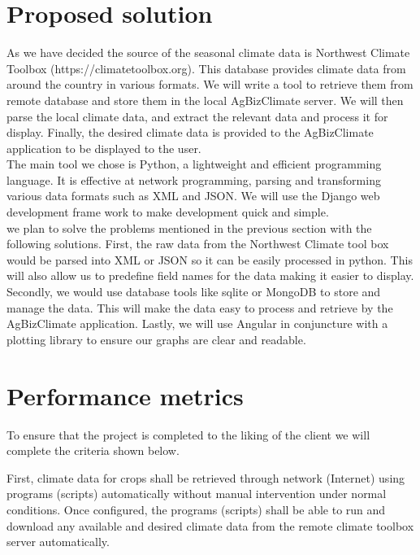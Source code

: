 \documentclass[letterpaper,10pt]{article}
\begin{document}
	  \section*{Proposed solution}
   As we have decided the source of the seasonal climate data is Northwest Climate Toolbox (https://climatetoolbox.org). This database provides climate data from around the country in various formats. We will write a tool to retrieve them from remote database and store them in the local AgBizClimate server. We will then  parse the local climate data, and extract the relevant data and process it for display. Finally, the desired climate data is provided to the AgBizClimate application to be displayed to the user.\\
   
   The main tool we chose is Python, a lightweight and efficient programming language. It is effective at network programming, parsing and transforming various data formats such as XML and JSON. We will use the Django web development frame work to make development quick and simple.\\
   
	we plan to solve the problems mentioned in the previous section with the following solutions. First, the raw data from the Northwest Climate tool box would be parsed into XML or JSON so it can be easily processed in python. This will also allow us to predefine field names for the data making it easier to display. Secondly, we would use database tools like sqlite or MongoDB to store and manage the data. This will make the data easy to process and retrieve by the AgBizClimate application. Lastly, we will use Angular in conjuncture with a plotting library to ensure our graphs are clear and readable.\\
	
	  \section*{Performance metrics}
		To ensure that the project is completed to the liking of the client we will complete the criteria shown below.
    
    First, climate data for crops shall be retrieved through network (Internet) using programs (scripts) automatically without manual intervention under normal conditions. Once configured, the programs (scripts) shall be able to run and download any available and desired climate data from the remote climate toolbox server automatically.\\
    
\end{document}
